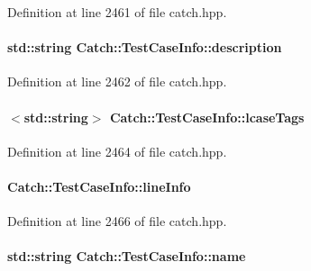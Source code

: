 Definition at line 2461 of file catch.\+hpp.

\hypertarget{a00086_a37fe2db9425bc45f6a33893eac31198e}{}
\paragraph[{description}]{\setlength{\rightskip}{0pt plus 5cm}std\+::string Catch\+::\+Test\+Case\+Info\+::description}\label{a00086_a37fe2db9425bc45f6a33893eac31198e}


Definition at line 2462 of file catch.\+hpp.

\hypertarget{a00086_a0ed3864a313e8ddc3ae38431be5be9ae}{}
\paragraph[{lcase\+Tags}]{$<$std\+::string$>$ Catch\+::\+Test\+Case\+Info\+::lcase\+Tags}\label{a00086_a0ed3864a313e8ddc3ae38431be5be9ae}


Definition at line 2464 of file catch.\+hpp.

\hypertarget{a00086_aa9407b7f442655b51a2aad24b3fa2fd3}{}
\paragraph[{line\+Info}]{ Catch\+::\+Test\+Case\+Info\+::line\+Info}\label{a00086_aa9407b7f442655b51a2aad24b3fa2fd3}


Definition at line 2466 of file catch.\+hpp.

\hypertarget{a00086_a463794e2f5cfead307c93efd134ade36}{}
\paragraph[{name}]{\setlength{\rightskip}{0pt plus 5cm}std\+::string Catch\+::\+Test\+Case\+Info\+::name}\label{a00086_a463794e2f5cfead307c93efd134ade36}


